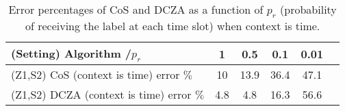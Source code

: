 \documentclass{article}%
\begin{document}
%
\normalsize%
\begin{table}[t]
\centering
{\fontsize{8}{6}\selectfont
\setlength{\tabcolsep}{.1em}
\begin{tabular}{|l|c|c|c|c|c|}
\hline
(Setting) Algorithm /$p_r$ & 1 & 0.5 & 0.1 & 0.01 \\
\hline
(Z1,S2) CoS (context is time) error $\%$ & 10 & 13.9 & 36.4 & 47.1 \\
\hline
(Z1,S2) DCZA (context is time) error $\%$ & 4.8 & 4.8 & 16.3 & 56.6 \\
\hline
\end{tabular}
}
\caption{Error percentages of CoS and DCZA as a function of $p_r$ (probability of receiving the label at each time slot) when context is time.}
\vspace{-0.2in}
\label{tab:errorperc}
\end{table}%
\end{document}
